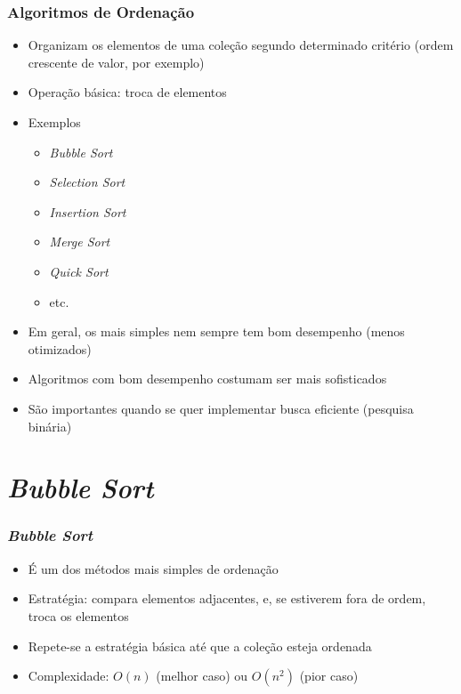 \documentclass[aspectratio=169]{beamer}
\begin{document}
\begin{frame}\frametitle{Algoritmos de Ordenação}
\begin{itemize}
	\item Organizam os elementos de uma coleção segundo determinado critério (ordem crescente de valor, por exemplo)
	\item Operação básica: troca de elementos
	\item Exemplos
	\begin{itemize}
		\item \emph{Bubble Sort}
		\item \emph{Selection Sort}
		\item \emph{Insertion Sort}
		\item \emph{Merge Sort}
		\item \emph{Quick Sort}
		\item etc.
	\end{itemize}
	\item Em geral, os mais simples nem sempre tem bom desempenho (menos otimizados)
	\item Algoritmos com bom desempenho costumam ser mais sofisticados
	\item São importantes quando se quer implementar busca eficiente (pesquisa binária)
\end{itemize}
\end{frame}

\section{\emph{Bubble Sort}}

\begin{frame}\frametitle{\emph{Bubble Sort}}
\begin{itemize}
	\item É um dos métodos mais simples de ordenação
	\item Estratégia: compara elementos adjacentes, e, se estiverem fora de ordem, troca os elementos
	\item Repete-se a estratégia básica até que a coleção esteja ordenada
	\item Complexidade: $O(n)$ (melhor caso) ou $O(n^2)$ (pior caso)
\end{itemize}
\end{frame}
\end{document}
